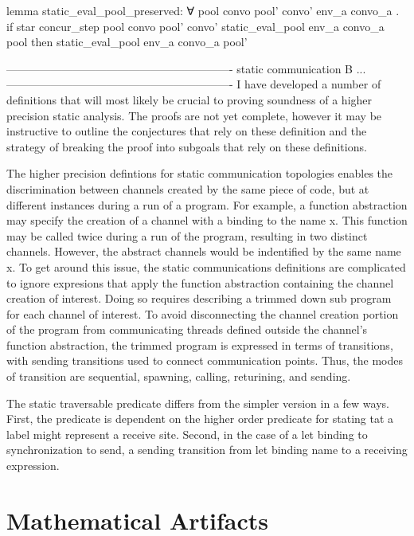 \documentclass{article}
\begin{document}
lemma static_eval_pool_preserved:
∀ pool convo pool' convo' env_a convo_a .
  if
    star concur_step pool convo pool' convo' 
    static_eval_pool env_a convo_a pool
  then
    static_eval_pool env_a convo_a pool'


-------------------------------------------------------------
static communication B ...
-------------------------------------------------------------
I have developed a number of definitions that will most likely be crucial to proving soundness
of a higher precision static analysis.  The proofs are not yet complete, however it may be
instructive to outline the conjectures that rely on these definition and the strategy of
breaking the proof into subgoals that rely on these definitions.


The higher precision defintions for static communication topologies enables the discrimination
between channels created by the same piece of code, but at different instances during a run of
a program.  For example, a function abstraction may specify the creation of a channel with a
binding to the name x.  This function may be called twice during a run of the program,
resulting in two distinct channels.  However, the abstract channels would be indentified by the
same name x.  To get around this issue, the static communications definitions are complicated
to ignore expresions that apply the function abstraction containing the channel creation of
interest.  Doing so requires describing a trimmed down sub program for each channel of
interest.  To avoid disconnecting the channel creation portion of the program from
communicating threads defined outside the channel's function abstraction, the trimmed program
is expressed in terms of transitions, with sending transitions used to connect communication
points. Thus, the modes of transition are sequential, spawning, calling, returining, and
sending. 


The static traversable predicate differs from the simpler version in a few ways.  First, the
predicate is dependent on the higher order predicate for stating tat a label might represent a
receive site.  Second, in the case of a let binding to synchronization to send, a sending
transition from let binding name to a receiving expression.






\section{Mathematical Artifacts}
\end{document}
